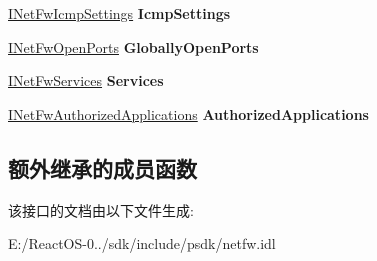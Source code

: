 \begin{DoxyCompactItemize}
\hyperlink{interface_i_net_fw_icmp_settings}{I\+Net\+Fw\+Icmp\+Settings} {\bfseries Icmp\+Settings}
\item 
\mbox{\label{interface_i_net_fw_profile_a19e17f396145676523dab99a5f5913d3}} 
\hyperlink{interface_i_net_fw_open_ports}{I\+Net\+Fw\+Open\+Ports} {\bfseries Globally\+Open\+Ports}
\item 
\mbox{\label{interface_i_net_fw_profile_acdbeaeb0fdc04072890437fa9d1c8fa7}} 
\hyperlink{interface_i_net_fw_services}{I\+Net\+Fw\+Services} {\bfseries Services}
\item 
\mbox{\label{interface_i_net_fw_profile_aa7c9f186353fce574befd3e4274bb98a}} 
\hyperlink{interface_i_net_fw_authorized_applications}{I\+Net\+Fw\+Authorized\+Applications} {\bfseries Authorized\+Applications}
\end{DoxyCompactItemize}
\subsection*{额外继承的成员函数}


该接口的文档由以下文件生成\+:\begin{DoxyCompactItemize}
\item 
E\+:/\+React\+O\+S-\/0../sdk/include/psdk/netfw.\+idl\end{DoxyCompactItemize}
